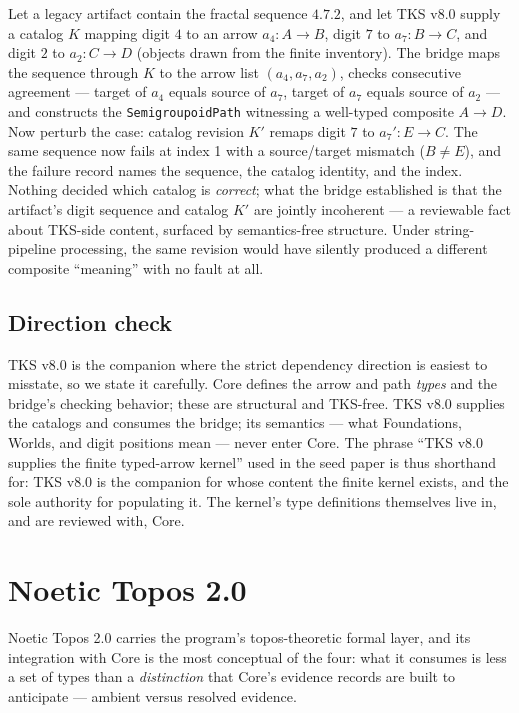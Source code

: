 \begin{example}\label{integ:ex:tks}
Let a legacy artifact contain the fractal sequence $4.7.2$, and let TKS v8.0 supply a catalog $K$ mapping digit $4$ to an arrow $a_4 : A \to B$, digit $7$ to $a_7 : B \to C$, and digit $2$ to $a_2 : C \to D$ (objects drawn from the finite inventory). The bridge maps the sequence through $K$ to the arrow list $(a_4, a_7, a_2)$, checks consecutive agreement --- target of $a_4$ equals source of $a_7$, target of $a_7$ equals source of $a_2$ --- and constructs the \texttt{SemigroupoidPath} witnessing a well-typed composite $A \to D$. Now perturb the case: catalog revision $K'$ remaps digit $7$ to $a_7' : E \to C$. The same sequence now fails at index 1 with a source/target mismatch ($B \neq E$), and the failure record names the sequence, the catalog identity, and the index. Nothing decided which catalog is \emph{correct}; what the bridge established is that the artifact's digit sequence and catalog $K'$ are jointly incoherent --- a reviewable fact about TKS-side content, surfaced by semantics-free structure. Under string-pipeline processing, the same revision would have silently produced a different composite ``meaning'' with no fault at all.
\end{example}

\subsection{Direction check}\label{integ:tks:direction}

TKS v8.0 is the companion where the strict dependency direction is easiest to misstate, so we state it carefully. Core defines the arrow and path \emph{types} and the bridge's checking behavior; these are structural and TKS-free. TKS v8.0 supplies the catalogs and consumes the bridge; its semantics --- what Foundations, Worlds, and digit positions mean --- never enter Core. The phrase ``TKS v8.0 supplies the finite typed-arrow kernel'' used in the seed paper is thus shorthand for: TKS v8.0 is the companion for whose content the finite kernel exists, and the sole authority for populating it. The kernel's type definitions themselves live in, and are reviewed with, Core.

\section{Noetic Topos 2.0}\label{integ:topos}

Noetic Topos 2.0 carries the program's topos-theoretic formal layer, and its integration with Core is the most conceptual of the four: what it consumes is less a set of types than a \emph{distinction} that Core's evidence records are built to anticipate --- ambient versus resolved evidence.

